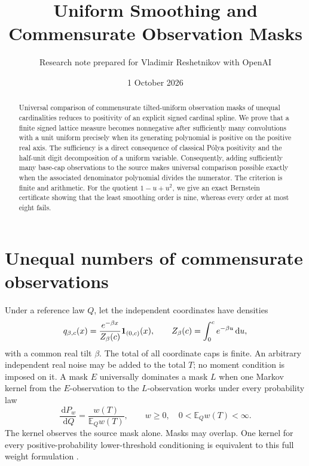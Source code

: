 \documentclass[11pt,a4paper]{article}
\title{Uniform Smoothing and Commensurate Observation Masks}
\author{Research note prepared for Vladimir Reshetnikov with OpenAI}
\date{1 October 2026}
\theoremstyle{remark}\newtheorem*{ednote}{Editorial note (ProveIt, 2026-10-01)}
\newcommand{\E}{\mathbb E}\newcommand{\R}{\mathbb R}\newcommand{\C}{\mathbb C}\newcommand{\N}{\mathbb N}
\newcommand{\dd}{\,\mathrm d}\newcommand{\ii}{\mathrm i}
\begin{document}
\maketitle
\begin{abstract}
Universal comparison of commensurate tilted-uniform observation masks of unequal cardinalities reduces to positivity of an explicit signed cardinal spline. We prove that a finite signed lattice measure becomes nonnegative after sufficiently many convolutions with a unit uniform precisely when its generating polynomial is positive on the positive real axis. The sufficiency is a direct consequence of classical P\'olya positivity and the half-unit digit decomposition of a uniform variable. Consequently, adding sufficiently many base-cap observations to the source makes universal comparison possible exactly when the associated denominator polynomial divides the numerator. The criterion is finite and arithmetic. For the quotient $1-u+u^2$, we give an exact Bernstein certificate showing that the least smoothing order is nine, whereas every order at most eight fails.
\end{abstract}

\section{Unequal numbers of commensurate observations}
Under a reference law $Q$, let the independent coordinates have densities
\begin{equation}\label{eq:density}
 q_{\beta,c}(x)=\frac{e^{-\beta x}}{Z_\beta(c)}\ind_{(0,c)}(x),
 \qquad Z_\beta(c)=\int_0^c e^{-\beta u}\dd u,
\end{equation}
with a common real tilt $\beta$. The total of all coordinate caps is finite. An arbitrary independent real noise may be added to the total $T$; no moment condition is imposed on it. A mask $E$ universally dominates a mask $L$ when one Markov kernel from the $E$-observation to the $L$-observation works under every probability law
\[
 \frac{\dd P_w}{\dd Q}=\frac{w(T)}{\E_Qw(T)},
 \qquad w\ge0,\quad 0<\E_Qw(T)<\infty.
\]
The kernel observes the source mask alone. Masks may overlap. One kernel for every positive-probability lower-threshold conditioning is equivalent to this full weight formulation \cite{Masks}.
\end{document}
